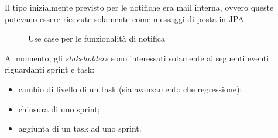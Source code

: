 Il tipo inizialmente previsto per le notifiche era mail interna, ovvero queste
potevano essere ricevute solamente come messaggi di posta in JPA.

\begin{figure}[H]
  \vspace*{\fill}
  \caption{Use case per le funzionalità di notifica}
  \label{fig:uc-notif}
\end{figure}

Al momento, gli \emph{stakeholders} sono interessati solamente ai seguenti
eventi riguardanti sprint e task:

\begin{itemize}
\item cambio di livello di un task (sia avanzamento che regressione);
\item chiusura di uno sprint;
\item aggiunta di un task ad uno sprint.
\end{itemize}

